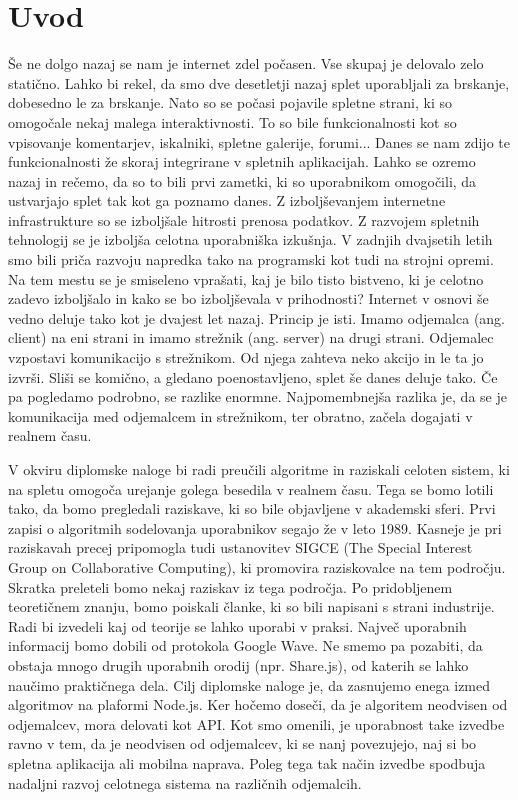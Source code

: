 \documentclass[a4paper, 12pt, twoside]{book}
\begin{document}
\chapter{Uvod}

Še ne dolgo nazaj se nam je internet zdel počasen. Vse skupaj je delovalo zelo statično. Lahko bi rekel, da smo dve desetletji nazaj splet uporabljali za brskanje, dobesedno le za brskanje. Nato so se počasi pojavile spletne strani, ki so omogočale nekaj malega interaktivnosti. To so bile funkcionalnosti kot so vpisovanje komentarjev, iskalniki, spletne galerije, forumi... Danes se nam zdijo te funkcionalnosti že skoraj integrirane v spletnih aplikacijah. Lahko se ozremo nazaj in rečemo, da so to bili prvi zametki, ki so uporabnikom omogočili, da ustvarjajo splet tak kot ga poznamo danes. Z izboljševanjem internetne infrastrukture so se izboljšale hitrosti prenosa podatkov. Z razvojem spletnih tehnologij se je izboljša celotna uporabniška izkušnja. V zadnjih dvajsetih letih smo bili priča razvoju napredka tako na programski kot tudi na strojni opremi. Na tem mestu se je smiseleno vprašati, kaj je bilo tisto bistveno, ki je celotno zadevo izboljšalo in kako se bo izboljševala v prihodnosti? Internet v osnovi še vedno deluje tako kot je dvajest let nazaj. Princip je isti. Imamo odjemalca (ang. client) na eni strani in imamo strežnik (ang. server) na drugi strani. Odjemalec vzpostavi komunikacijo s strežnikom. Od njega zahteva neko akcijo in le ta jo izvrši. Sliši se komično, a gledano poenostavljeno, splet še danes deluje tako. Če pa pogledamo podrobno, se razlike enormne. Najpomembnejša razlika je, da se je komunikacija med odjemalcem in strežnikom, ter obratno, začela dogajati v realnem času.

V okviru diplomske naloge bi radi preučili algoritme in raziskali celoten sistem, ki na spletu omogoča urejanje golega besedila v realnem času. Tega se bomo lotili tako, da bomo pregledali raziskave, ki so bile objavljene v akademski sferi. Prvi zapisi o algoritmih sodelovanja uporabnikov segajo že v leto 1989. Kasneje je pri raziskavah precej pripomogla tudi ustanovitev SIGCE (The Special Interest Group on Collaborative Computing), ki promovira raziskovalce na tem področju. Skratka preleteli bomo nekaj raziskav iz tega področja. Po pridobljenem teoretičnem znanju, bomo poiskali članke, ki so bili napisani s strani industrije. Radi bi izvedeli kaj od teorije se lahko uporabi v praksi. Največ uporabnih informacij bomo dobili od protokola Google Wave. Ne smemo pa pozabiti, da obstaja mnogo drugih uporabnih orodij (npr. Share.js), od katerih se lahko naučimo praktičnega dela. Cilj diplomske naloge je, da zasnujemo enega izmed algoritmov na plaformi Node.js.  Ker hočemo doseči, da je algoritem neodvisen od odjemalcev, mora delovati kot API. Kot smo omenili, je uporabnost take izvedbe ravno v tem, da je neodvisen od odjemalcev, ki se nanj povezujejo, naj si bo spletna aplikacija ali mobilna naprava. Poleg tega tak način izvedbe spodbuja nadaljni razvoj celotnega sistema na različnih odjemalcih.
\end{document}

